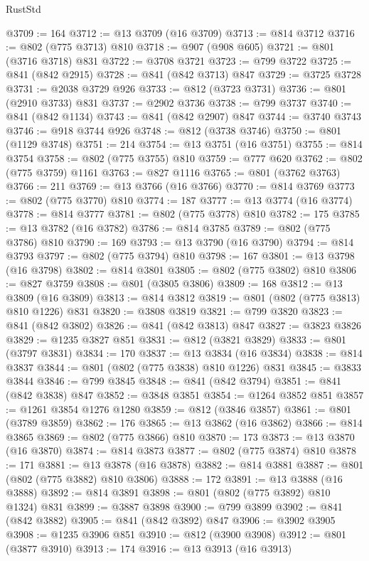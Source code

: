 \begin{lexlean}{RustStd}
\begin{coremodule}
@3709 := 164
@3712 := @13 @3709 (@16 @3709)
@3713 := @814 @3712
@3716 := @802 (@775 @3713) @810
@3718 := @907 (@908 @605)
@3721 := @801 (@3716 @3718) @831
@3722 := @3708 @3721
@3723 := @799 @3722
@3725 := @841 (@842 @2915)
@3728 := @841 (@842 @3713) @847
@3729 := @3725 @3728
@3731 := @2038 @3729 @926
@3733 := @812 (@3723 @3731)
@3736 := @801 (@2910 @3733) @831
@3737 := @2902 @3736
@3738 := @799 @3737
@3740 := @841 (@842 @1134)
@3743 := @841 (@842 @2907) @847
@3744 := @3740 @3743
@3746 := @918 @3744 @926
@3748 := @812 (@3738 @3746)
@3750 := @801 (@1129 @3748)
@3751 := 214
@3754 := @13 @3751 (@16 @3751)
@3755 := @814 @3754
@3758 := @802 (@775 @3755) @810
@3759 := @777 @620
@3762 := @802 (@775 @3759) @1161
@3763 := @827 @1116
@3765 := @801 (@3762 @3763)
@3766 := 211
@3769 := @13 @3766 (@16 @3766)
@3770 := @814 @3769
@3773 := @802 (@775 @3770) @810
@3774 := 187
@3777 := @13 @3774 (@16 @3774)
@3778 := @814 @3777
@3781 := @802 (@775 @3778) @810
@3782 := 175
@3785 := @13 @3782 (@16 @3782)
@3786 := @814 @3785
@3789 := @802 (@775 @3786) @810
@3790 := 169
@3793 := @13 @3790 (@16 @3790)
@3794 := @814 @3793
@3797 := @802 (@775 @3794) @810
@3798 := 167
@3801 := @13 @3798 (@16 @3798)
@3802 := @814 @3801
@3805 := @802 (@775 @3802) @810
@3806 := @827 @3759
@3808 := @801 (@3805 @3806)
@3809 := 168
@3812 := @13 @3809 (@16 @3809)
@3813 := @814 @3812
@3819 := @801 (@802 (@775 @3813) @810 @1226) @831
@3820 := @3808 @3819
@3821 := @799 @3820
@3823 := @841 (@842 @3802)
@3826 := @841 (@842 @3813) @847
@3827 := @3823 @3826
@3829 := @1235 @3827 @851
@3831 := @812 (@3821 @3829)
@3833 := @801 (@3797 @3831)
@3834 := 170
@3837 := @13 @3834 (@16 @3834)
@3838 := @814 @3837
@3844 := @801 (@802 (@775 @3838) @810 @1226) @831
@3845 := @3833 @3844
@3846 := @799 @3845
@3848 := @841 (@842 @3794)
@3851 := @841 (@842 @3838) @847
@3852 := @3848 @3851
@3854 := @1264 @3852 @851
@3857 := @1261 @3854 @1276 @1280
@3859 := @812 (@3846 @3857)
@3861 := @801 (@3789 @3859)
@3862 := 176
@3865 := @13 @3862 (@16 @3862)
@3866 := @814 @3865
@3869 := @802 (@775 @3866) @810
@3870 := 173
@3873 := @13 @3870 (@16 @3870)
@3874 := @814 @3873
@3877 := @802 (@775 @3874) @810
@3878 := 171
@3881 := @13 @3878 (@16 @3878)
@3882 := @814 @3881
@3887 := @801 (@802 (@775 @3882) @810 @3806)
@3888 := 172
@3891 := @13 @3888 (@16 @3888)
@3892 := @814 @3891
@3898 := @801 (@802 (@775 @3892) @810 @1324) @831
@3899 := @3887 @3898
@3900 := @799 @3899
@3902 := @841 (@842 @3882)
@3905 := @841 (@842 @3892) @847
@3906 := @3902 @3905
@3908 := @1235 @3906 @851
@3910 := @812 (@3900 @3908)
@3912 := @801 (@3877 @3910)
@3913 := 174
@3916 := @13 @3913 (@16 @3913)

\end{coremodule}
\end{lexlean}

